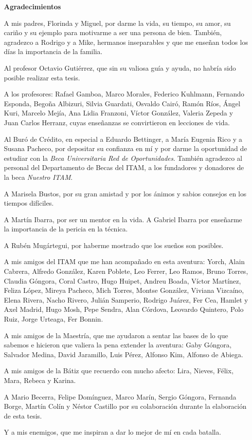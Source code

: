\begin{center}
{\huge \bfseries Agradecimientos\\}
\end{center}

A mis padres, Florinda y Miguel, por darme la vida, su tiempo, su amor, su cariño y su ejemplo para motivarme a ser una persona de bien. También, agradezco a Rodrigo y a Mike, hermanos inseparables y que me enseñan todos los días la importancia de la familia.

Al profesor Octavio Gutiérrez, que sin su valiosa guía y ayuda, no habría sido posible realizar esta tesis.

A los profesores: Rafael Gamboa, Marco Morales, Federico Kuhlmann, Fernando Esponda, Begoña Albizuri, Silvia Guardati, Osvaldo Cairó, Ramón Ríos, Ángel Kuri, Marcelo Mejía, Ana Lidia Franzoni, Víctor González, Valeria Zepeda y Juan Carlos Herranz, cuyas enseñanzas se convirtieron en lecciones de vida.

Al Buró de Crédito, en especial a Eduardo Bettinger, a María Eugenia Rico y a Susana Pacheco, por depositar su confianza en mí y por darme la oportunidad de estudiar con la \emph{Beca Universitaria Red de Oportunidades}. También agradezco al personal del Departamento de Becas del ITAM, a los fundadores y donadores de la beca \emph{Nuestro ITAM}.

A Marisela Bustos, por su gran amistad y por los ánimos y sabios consejos en los tiempos difíciles.

A Martín Ibarra, por ser un mentor en la vida. A Gabriel Ibarra por enseñarme la importancia de la pericia en la técnica.

A Rubén Mugártegui, por haberme mostrado que los sueños son posibles.

A mis amigos del ITAM que me han acompañado en esta aventura: Yorch, Alain Cabrera, Alfredo González, Karen Poblete, Leo Ferrer, Leo Ramos, Bruno Torres, Claudia Góngora, Coral Castro, Hugo Huipet, Andreu Boada, Víctor Martínez, Feliza López, Mireya Pacheco, Mich Torres, Montse González, Viviana Vizcaíno, Elena Rivera, Nacho Rivero, Julián Samperio, Rodrigo Juárez, Fer Cea, Hamlet y Axel Madrid, Hugo Mosh, Pepe Sendra, Alan Córdova, Leovardo Quintero, Polo Ruiz, Jorge Urteaga, Fer Bonnin.

A mis amigos de la Maestría, que me ayudaron a sentar las bases de lo que sabemos e hicieron que valiera la pena extender la aventura: Gaby Góngora, Salvador Medina, David Jaramillo, Luis Pérez, Alfonso Kim, Alfonso de Abiega.

A mis amigos de la Bátiz que recuerdo con mucho afecto: Lira, Nieves, Félix, Mara, Rebeca y Karina.

A Mario Becerra, Felipe Domínguez, Marco Marín, Sergio Góngora, Fernanda Borge, Martín Colín y Néstor Castillo por su colaboración durante la elaboración de esta tesis.

Y a mis enemigos, que me inspiran a dar lo mejor de mí en cada batalla.
\clearpage